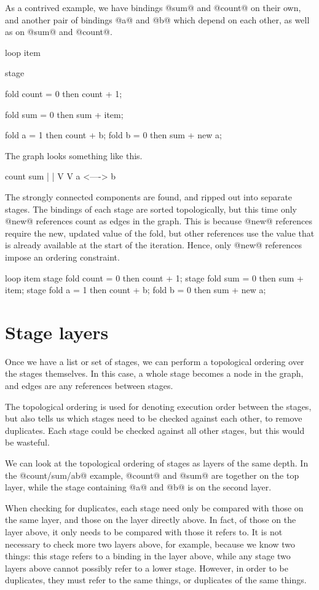 As a contrived example, we have bindings @sum@ and @count@ on their own, and another pair of bindings @a@ and @b@ which depend on each other, as well as on @sum@ and @count@.
\begin{code}
loop item {
  stage {
    fold count = 0 then count + 1;

    fold sum   = 0 then sum   + item;

    fold a     = 1 then count + b;
    fold b     = 0 then sum + new a;
  }
}
\end{code}

The graph looks something like this.
\begin{code}
  count     sum
    |        |
    V        V
    a <----> b
\end{code}

The strongly connected components are found, and ripped out into separate stages.
The bindings of each stage are sorted topologically, but this time only @new@ references count as edges in the graph.
This is because @new@ references require the new, updated value of the fold, but other references use the value that is already available at the start of the iteration.
Hence, only @new@ references impose an ordering constraint.
\begin{code}
loop item {
  stage {
    fold count = 0 then count + 1;
  }
  stage {
    fold sum   = 0 then sum   + item;
  }
  stage {
    fold a     = 1 then count + b;
    fold b     = 0 then sum + new a;
  }
}
\end{code}

\section{Stage layers}
Once we have a list or set of stages, we can perform a topological ordering over the stages themselves.
In this case, a whole stage becomes a node in the graph, and edges are any references between stages.

The topological ordering is used for denoting execution order between the stages, but also tells us which stages need to be checked against each other, to remove duplicates.
Each stage could be checked against all other stages, but this would be wasteful.

We can look at the topological ordering of stages as layers of the same depth.
In the @count/sum/ab@ example, @count@ and @sum@ are together on the top layer, while the stage containing @a@ and @b@ is on the second layer.

When checking for duplicates, each stage need only be compared with those on the same layer, and those on the layer directly above.
In fact, of those on the layer above, it only needs to be compared with those it refers to.
It is not necessary to check more two layers above, for example, because we know two things:
this stage refers to a binding in the layer above, while any stage two layers above cannot possibly refer to a lower stage.
However, in order to be duplicates, they must refer to the same things, or duplicates of the same things.


